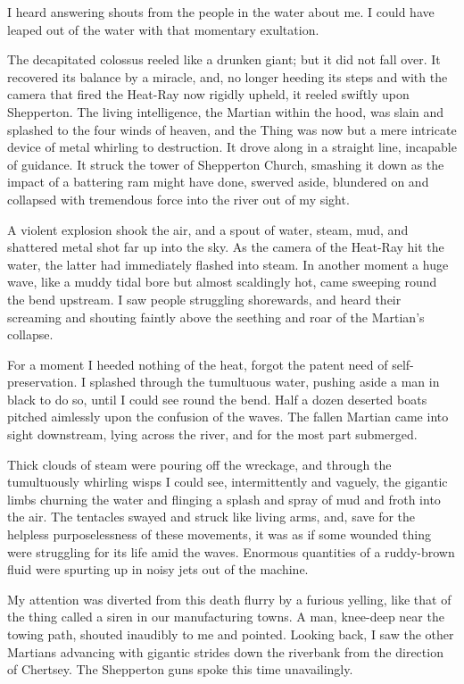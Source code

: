I heard answering shouts from the people in the water about me. I could have leaped out of the water with that momentary exultation.

The decapitated colossus reeled like a drunken giant; but it did not fall over. It recovered its balance by a miracle, and, no longer heeding its steps and with the camera that fired the Heat-Ray now rigidly upheld, it reeled swiftly upon Shepperton. The living intelligence, the Martian within the hood, was slain and splashed to the four winds of heaven, and the Thing was now but a mere intricate device of metal whirling to destruction. It drove along in a straight line, incapable of guidance. It struck the tower of Shepperton Church, smashing it down as the impact of a battering ram might have done, swerved aside, blundered on and collapsed with tremendous force into the river out of my sight.

A violent explosion shook the air, and a spout of water, steam, mud, and shattered metal shot far up into the sky. As the camera of the Heat-Ray hit the water, the latter had immediately flashed into steam. In another moment a huge wave, like a muddy tidal bore but almost scaldingly hot, came sweeping round the bend upstream. I saw people struggling shorewards, and heard their screaming and shouting faintly above the seething and roar of the Martian's collapse.

For a moment I heeded nothing of the heat, forgot the patent need of self-preservation. I splashed through the tumultuous water, pushing aside a man in black to do so, until I could see round the bend. Half a dozen deserted boats pitched aimlessly upon the confusion of the waves. The fallen Martian came into sight downstream, lying across the river, and for the most part submerged.

Thick clouds of steam were pouring off the wreckage, and through the tumultuously whirling wisps I could see, intermittently and vaguely, the gigantic limbs churning the water and flinging a splash and spray of mud and froth into the air. The tentacles swayed and struck like living arms, and, save for the helpless purposelessness of these movements, it was as if some wounded thing were struggling for its life amid the waves. Enormous quantities of a ruddy-brown fluid were spurting up in noisy jets out of the machine.

My attention was diverted from this death flurry by a furious yelling, like that of the thing called a siren in our manufacturing towns. A man, knee-deep near the towing path, shouted inaudibly to me and pointed. Looking back, I saw the other Martians advancing with gigantic strides down the riverbank from the direction of Chertsey. The Shepperton guns spoke this time unavailingly.

